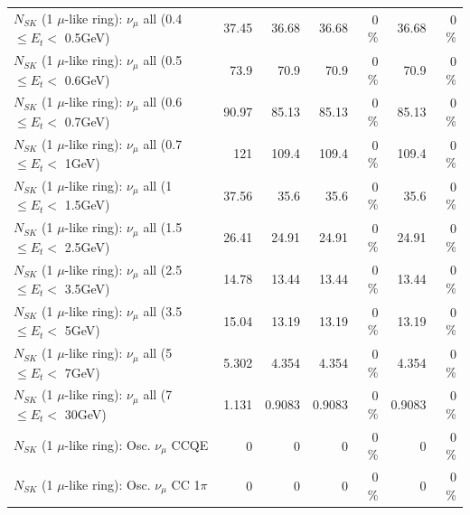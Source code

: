\begin{table}
\begin{tabular}{| l | r | r | r  r | r  r |}
       $N_{SK}$ (1 $\mu$-like ring): $\nu_{\mu}$ all (0.4 $\leq E_{t} <$ 0.5GeV) &           37.45 &           36.68 &           36.68 &        0 \%  &           36.68 &        0 \%  \\ 
       $N_{SK}$ (1 $\mu$-like ring): $\nu_{\mu}$ all (0.5 $\leq E_{t} <$ 0.6GeV) &            73.9 &            70.9 &            70.9 &        0 \%  &            70.9 &        0 \%  \\ 
       $N_{SK}$ (1 $\mu$-like ring): $\nu_{\mu}$ all (0.6 $\leq E_{t} <$ 0.7GeV) &           90.97 &           85.13 &           85.13 &        0 \%  &           85.13 &        0 \%  \\ 
         $N_{SK}$ (1 $\mu$-like ring): $\nu_{\mu}$ all (0.7 $\leq E_{t} <$ 1GeV) &             121 &           109.4 &           109.4 &        0 \%  &           109.4 &        0 \%  \\ 
         $N_{SK}$ (1 $\mu$-like ring): $\nu_{\mu}$ all (1 $\leq E_{t} <$ 1.5GeV) &           37.56 &            35.6 &            35.6 &        0 \%  &            35.6 &        0 \%  \\ 
       $N_{SK}$ (1 $\mu$-like ring): $\nu_{\mu}$ all (1.5 $\leq E_{t} <$ 2.5GeV) &           26.41 &           24.91 &           24.91 &        0 \%  &           24.91 &        0 \%  \\ 
       $N_{SK}$ (1 $\mu$-like ring): $\nu_{\mu}$ all (2.5 $\leq E_{t} <$ 3.5GeV) &           14.78 &           13.44 &           13.44 &        0 \%  &           13.44 &        0 \%  \\ 
         $N_{SK}$ (1 $\mu$-like ring): $\nu_{\mu}$ all (3.5 $\leq E_{t} <$ 5GeV) &           15.04 &           13.19 &           13.19 &        0 \%  &           13.19 &        0 \%  \\ 
           $N_{SK}$ (1 $\mu$-like ring): $\nu_{\mu}$ all (5 $\leq E_{t} <$ 7GeV) &           5.302 &           4.354 &           4.354 &        0 \%  &           4.354 &        0 \%  \\ 
          $N_{SK}$ (1 $\mu$-like ring): $\nu_{\mu}$ all (7 $\leq E_{t} <$ 30GeV) &           1.131 &          0.9083 &          0.9083 &        0 \%  &          0.9083 &        0 \%  \\ 
\hline
\hline
                               $N_{SK}$ (1 $\mu$-like ring): Osc. $\nu_\mu$ CCQE &               0 &               0 &               0 &        0 \%  &               0 &        0 \%  \\ 
                          $N_{SK}$ (1 $\mu$-like ring): Osc. $\nu_\mu$ CC 1$\pi$ &               0 &               0 &               0 &        0 \%  &               0 &        0 \%  \\ 

\end{tabular}
\end{table}
